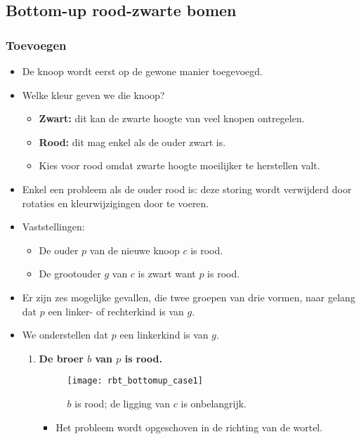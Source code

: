 \subsection{Bottom-up rood-zwarte bomen}
\subsubsection{Toevoegen}
\begin{itemize}
    \item De knoop wordt eerst op de gewone manier toegevoegd.
    \item Welke kleur geven we die knoop?
    \begin{itemize}
        \item \textbf{Zwart:} dit kan de zwarte hoogte van veel knopen ontregelen.
        \item \textbf{Rood:} dit mag enkel als de ouder zwart is.
        \item Kies voor rood omdat zwarte hoogte moeilijker te herstellen valt.
    \end{itemize}
    \item Enkel een probleem als de ouder rood is: deze storing wordt verwijderd door rotaties en kleurwijzigingen door te voeren.
    \item Vaststellingen:
    \begin{itemize}
        \item De ouder $p$ van de nieuwe knoop $c$ is rood.
        \item De grootouder $g$ van $c$ is zwart want $p$ is rood.
    \end{itemize}
    \item Er zijn zes mogelijke gevallen, die twee groepen van drie vormen, naar gelang dat $p$ een linker- of rechterkind is van $g$. 
    \item We onderstellen dat $p$ een linkerkind is van $g$. 
    \begin{enumerate}
        \item \textbf{De broer $b$ van $p$ is rood.}
        \begin{figure}[ht]
            \centering
            \texttt{[image: rbt\_bottomup\_case1]}
            \caption{$b$ is rood; de ligging van $c$ is onbelangrijk.}
            \label{fig:rbt_bottomup_case1}
        \end{figure}
        \begin{itemize}
            \item Het probleem wordt opgeschoven in de richting van de wortel.

\end{itemize}
\end{enumerate}
\end{itemize}
